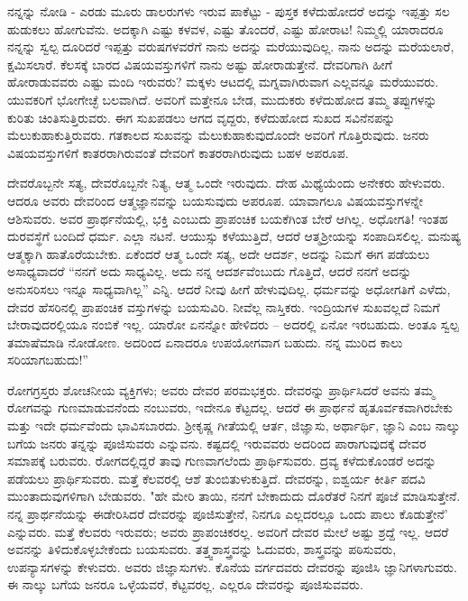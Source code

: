 ನನ್ನನ್ನು ನೋಡಿ - ಎರಡು ಮೂರು ಡಾಲರುಗಳು ಇರುವ ಪಾಕೆಟ್ಟು - ಪುಸ್ತಕ ಕಳೆದುಹೋದರೆ ಅದನ್ನು ಇಪ್ಪತ್ತು ಸಲ ಹುಡುಕಲು ಹೋಗುವೆನು. ಅದಕ್ಕಾಗಿ ಎಷ್ಟು ಕಳವಳ, ಎಷ್ಟು ತೊಂದರೆ, ಎಷ್ಟು ಹೋರಾಟ! ನಿಮ್ಮಲ್ಲಿ ಯಾರಾದರೂ ನನ್ನನ್ನು ಸ್ವಲ್ಪ ದೂರಿದರೆ ಇಪ್ಪತ್ತು ವರುಷಗಳವರೆಗೆ ನಾನು ಅದನ್ನು ಮರೆಯುವುದಿಲ್ಲ. ನಾನು ಅದನ್ನು ಮರೆಯಲಾರೆ, ಕ್ಷಮಿಸಲಾರೆ. ಕೆಲಸಕ್ಕೆ ಬಾರದ ವಿಷಯವಸ್ತುಗಳಿಗೆ ನಾನು ಅಷ್ಟು ಹೋರಾಡುತ್ತೇನೆ. ದೇವರಿಗಾಗಿ ಹೀಗೆ ಹೋರಾಡುವವರು ಎಷ್ಟು ಮಂದಿ ಇರುವರು? ಮಕ್ಕಳು ಆಟದಲ್ಲಿ ಮಗ್ನವಾಗಿರುವಾಗ ಎಲ್ಲವನ್ನೂ ಮರೆಯುವರು. ಯುವಕರಿಗೆ ಭೋಗೇಚ್ಛೆ ಬಲವಾಗಿದೆ. ಅವರಿಗೆ ಮತ್ತೇನೂ ಬೇಡ, ಮುದುಕರು ಕಳೆದುಹೋದ ತಮ್ಮ ತಪ್ಪುಗಳನ್ನು ಕುರಿತು ಚಿಂತಿಸುತ್ತಿರುವರು. ಈಗ ಸುಖಪಡಲು ಆಗದ ವೃದ್ದರು, ಕಳೆದುಹೋದ ಸುಖದ ಸವಿನೆನಪನ್ನು ಮೆಲುಕುಹಾಕುತ್ತಿರುವರು. ಗತಕಾಲದ ಸುಖವನ್ನು ಮೆಲುಕುಹಾಕುವುದೊಂದೇ ಅವರಿಗೆ ಗೊತ್ತಿರುವುದು. ಜನರು ವಿಷಯವಸ್ತುಗಳಿಗೆ ಕಾತರರಾಗಿರುವಂತೆ ದೇವರಿಗೆ ಕಾತರರಾಗಿರುವುದು ಬಹಳ ಅಪರೂಪ.

ದೇವರೊಬ್ಬನೇ ಸತ್ಯ, ದೇವರೊಬ್ಬನೇ ನಿತ್ಯ, ಆತ್ಮ ಒಂದೇ ಇರುವುದು. ದೇಹ ಮಿಥ್ಯೆಯೆಂದು ಅನೇಕರು ಹೇಳುವರು. ಆದರೂ ಅವರು ದೇವರಿಂದ ಆತ್ಮಜ್ಞಾನವನ್ನು ಬಯಸುವುದು ಅಪರೂಪ. ಯಾವಾಗಲೂ ವಿಷಯವಸ್ತುಗಳನ್ನೇ ಆಶಿಸುವರು. ಅವರ ಪ್ರಾರ್ಥನೆಯಲ್ಲಿ, ಭಕ್ತಿ ಎಂಬುದು ಪ್ರಾಪಂಚಿಕ ಬಯಕೆಗಿಂತ ಬೇರೆ ಆಗಿಲ್ಲ. ಅಧೋಗತಿ! ಇಂತಹ ದುರವಸ್ಥೆಗೆ ಬಂದಿದೆ ಧರ್ಮ. ಎಲ್ಲಾ ನಟನೆ. ಆಯುಸ್ಸು ಕಳೆಯುತ್ತಿದೆ, ಆದರೆ ಆತ್ಮಶ‍್ರೀಯನ್ನು ಸಂಪಾದಿಸಲಿಲ್ಲ. ಮನುಷ್ಯ ಆತ್ಮಕ್ಕಾಗಿ ಹಾತೊರೆಯಬೇಕು. ಏಕೆಂದರೆ ಆತ್ಮ ಒಂದೇ ಸತ್ಯ, ಅದೇ ಆದರ್ಶ, ಅದನ್ನು ನಿಮಗೆ ಈಗ ಪಡೆಯಲು ಅಸಾಧ್ಯವಾದರೆ “ನನಗೆ ಅದು ಸಾಧ್ಯವಿಲ್ಲ. ಅದು ನನ್ನ ಆದರ್ಶವೆಂಬುದು ಗೊತ್ತಿದೆ, ಆದರೆ ನನಗೆ ಅದನ್ನು ಅನುಸರಿಸಲು ಇನ್ನೂ ಸಾಧ್ಯವಾಗಿಲ್ಲ” ಎನ್ನಿ. ಆದರೆ ನೀವು ಹೀಗೆ ಹೇಳುವುದಿಲ್ಲ. ಧರ್ಮವನ್ನು ಅಧೋಗತಿಗೆ ಎಳೆದು, ದೇವರ ಹೆಸರಿನಲ್ಲಿ ಪ್ರಾಪಂಚಿಕ ವಸ್ತುಗಳನ್ನು ಬಯಸುವಿರಿ. ನೀವೆಲ್ಲ ನಾಸ್ತಿಕರು. ಇಂದ್ರಿಯಗಳ ಸುಖವಲ್ಲದೆ ನಿಮಗೆ ಬೇರಾವುದರಲ್ಲಿಯೂ ನಂಬಿಕೆ ಇಲ್ಲ. ಯಾರೋ ಏನನ್ನೋ ಹೇಳಿದರು – ಅದರಲ್ಲಿ ಏನೋ ಇರಬಹುದು. ಅಂತೂ ಸ್ವಲ್ಪ ತಮಾಷೆಮಾಡಿ ನೋಡೋಣ. ಅದರಿಂದ ಏನಾದರೂ ಉಪಯೋಗವಾಗ ಬಹುದು. ನನ್ನ ಮುರಿದ ಕಾಲು ಸರಿಯಾಗಬಹುದು!”

ರೋಗಗ್ರಸ್ತರು ಶೋಚನೀಯ ವ್ಯಕ್ತಿಗಳು; ಅವರು ದೇವರ ಪರಮಭಕ್ತರು. ದೇವರನ್ನು ಪ್ರಾರ್ಥಿಸಿದರೆ ಅವನು ತಮ್ಮ ರೋಗವನ್ನು ಗುಣಮಾಡುವನೆಂದು ನಂಬುವರು, ಇದೇನೂ ಕೆಟ್ಟದಲ್ಲ. ಆದರೆ ಈ ಪ್ರಾರ್ಥನೆ ಹೃತೂರ್ವಕವಾಗಿರಬೇಕು ಮತ್ತು ಇದೇ ಧರ್ಮವೆಂದು ಭಾವಿಸಬಾರದು. ಶ‍್ರೀಕೃಷ್ಣ ಗೀತೆಯಲ್ಲಿ ಆರ್ತ, ಜಿಜ್ಞಾಸು, ಅರ್ಥಾರ್ಥಿ, ಜ್ಞಾನಿ ಎಂಬ ನಾಲ್ಕು ಬಗೆಯ ಜನರು ತನ್ನನ್ನು ಪೂಜಿಸುವರು ಎನ್ನುವನು. ಕಷ್ಟದಲ್ಲಿ ಇರುವವರು ಅದರಿಂದ ಪಾರಾಗುವುದಕ್ಕೆ ದೇವರ ಸಮಾಪಕ್ಕೆ ಬರುವರು. ರೋಗದಲ್ಲಿದ್ದರೆ ತಾವು ಗುಣವಾಗಲೆಂದು ಪ್ರಾರ್ಥಿಸುವರು. ದ್ರವ್ಯ ಕಳೆದುಕೊಂಡರೆ ಅದನ್ನು ಪಡೆಯಲು ಪ್ರಾರ್ಥಿಸುವರು. ಮತ್ತೆ ಕೆಲವರಲ್ಲಿ ಆಶೆ ತುಂಬಿತುಳುಕುತ್ತಿದೆ. ದೇವರನ್ನು, ಐಶ್ವರ್ಯ ಕೀರ್ತಿ ಪದವಿ ಮುಂತಾದುವುಗಳಿಗಾಗಿ ಬೇಡುವರು. "ಹೇ ಮೇರಿ ತಾಯಿ, ನನಗೆ ಬೇಕಾದುದು ದೊರೆತರೆ ನಿನಗೆ ಪೂಜೆ ಮಾಡಿಸುತ್ತೇನೆ. ನನ್ನ ಪ್ರಾರ್ಥನೆಯನ್ನು ಈಡೇರಿಸಿದರೆ ದೇವರನ್ನು ಪೂಜಿಸುತ್ತೇನೆ, ನಿನಗೂ ಎಲ್ಲದರಲ್ಲೂ ಒಂದು ಪಾಲು ಕೊಡುತ್ತೇನೆ' ಎನ್ನುವರು. ಮತ್ತೆ ಕೆಲವರು ಇರುವರು; ಅವರು ಪ್ರಾಪಂಚಿಕರಲ್ಲ. ಅವರಿಗೆ ದೇವರ ಮೇಲೆ ಅಷ್ಟು ಶ್ರದ್ದೆ ಇಲ್ಲ. ಆದರೆ ಅವನನ್ನು ತಿಳಿದುಕೊಳ್ಳಬೇಕೆಂದು ಬಯಸುವರು. ತತ್ತ್ವಶಾಸ್ತ್ರವನ್ನು ಓದುವರು, ಶಾಸ್ತ್ರವನ್ನು ಪಠಿಸುವರು, ಉಪನ್ಯಾಸಗಳನ್ನು ಕೇಳುವರು. ಅವರು ಜಿಜ್ಞಾಸುಗಳು. ಕೊನೆಯ ವರ್ಗದವರು ದೇವರನ್ನು ಪೂಜಿಸಿ ಜ್ಞಾನಿಗಳಾಗುವರು. ಈ ನಾಲ್ಕು ಬಗೆಯ ಜನರೂ ಒಳ್ಳೆಯವರೆ, ಕೆಟ್ಟವರಲ್ಲ. ಎಲ್ಲರೂ ದೇವರನ್ನು ಪೂಜಿಸುವವರು.


